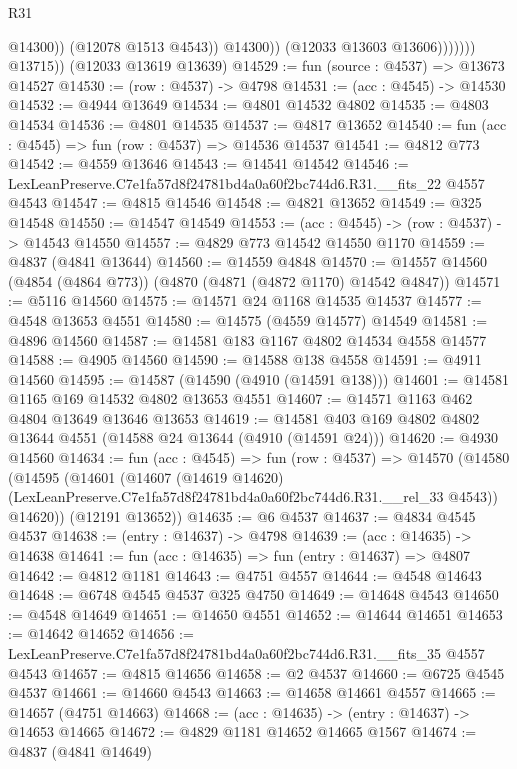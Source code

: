 \begin{lexlean}{R31}
\begin{coremodule}
                              @14300))
                          (@12078 @1513 @4543))
                        @14300))
                    (@12033 @13603 @13606)))))))
        @13715))
    (@12033 @13619 @13639)
@14529 := fun (source : @4537) => @13673 @14527
@14530 := (row : @4537) -> @4798
@14531 := (acc : @4545) -> @14530
@14532 := @4944 @13649
@14534 := @4801 @14532 @4802
@14535 := @4803 @14534
@14536 := @4801 @14535
@14537 := @4817 @13652
@14540 := fun (acc : @4545) => fun (row : @4537) => @14536 @14537
@14541 := @4812 @773
@14542 := @4559 @13646
@14543 := @14541 @14542
@14546 := LexLeanPreserve.C7e1fa57d8f24781bd4a0a60f2bc744d6.R31.__fits_22 @4557 @4543
@14547 := @4815 @14546
@14548 := @4821 @13652
@14549 := @325 @14548
@14550 := @14547 @14549
@14553 := (acc : @4545) -> (row : @4537) -> @14543 @14550
@14557 := @4829 @773 @14542 @14550 @1170
@14559 := @4837 (@4841 @13644)
@14560 := @14559 @4848
@14570 := @14557 @14560 (@4854 (@4864 @773)) (@4870 (@4871 (@4872 @1170) @14542 @4847))
@14571 := @5116 @14560
@14575 := @14571 @24 @1168 @14535 @14537
@14577 := @4548 @13653 @4551
@14580 := @14575 (@4559 @14577) @14549
@14581 := @4896 @14560
@14587 := @14581 @183 @1167 @4802 @14534 @4558 @14577
@14588 := @4905 @14560
@14590 := @14588 @138 @4558
@14591 := @4911 @14560
@14595 := @14587 (@14590 (@4910 (@14591 @138)))
@14601 := @14581 @1165 @169 @14532 @4802 @13653 @4551
@14607 := @14571 @1163 @462 @4804 @13649 @13646 @13653
@14619 := @14581 @403 @169 @4802 @4802 @13644 @4551 (@14588 @24 @13644 (@4910 (@14591 @24)))
@14620 := @4930 @14560
@14634 := fun (acc : @4545) =>
  fun (row : @4537) =>
  @14570
    (@14580
      (@14595
        (@14601
          (@14607
            (@14619 @14620)
            (LexLeanPreserve.C7e1fa57d8f24781bd4a0a60f2bc744d6.R31.__rel_33 @4543))
          @14620))
      (@12191 @13652))
@14635 := @6 @4537
@14637 := @4834 @4545 @4537
@14638 := (entry : @14637) -> @4798
@14639 := (acc : @14635) -> @14638
@14641 := fun (acc : @14635) => fun (entry : @14637) => @4807
@14642 := @4812 @1181
@14643 := @4751 @4557
@14644 := @4548 @14643
@14648 := @6748 @4545 @4537 @325 @4750
@14649 := @14648 @4543
@14650 := @4548 @14649
@14651 := @14650 @4551
@14652 := @14644 @14651
@14653 := @14642 @14652
@14656 := LexLeanPreserve.C7e1fa57d8f24781bd4a0a60f2bc744d6.R31.__fits_35 @4557 @4543
@14657 := @4815 @14656
@14658 := @2 @4537
@14660 := @6725 @4545 @4537
@14661 := @14660 @4543
@14663 := @14658 @14661 @4557
@14665 := @14657 (@4751 @14663)
@14668 := (acc : @14635) -> (entry : @14637) -> @14653 @14665
@14672 := @4829 @1181 @14652 @14665 @1567
@14674 := @4837 (@4841 @14649)

\end{coremodule}
\end{lexlean}
